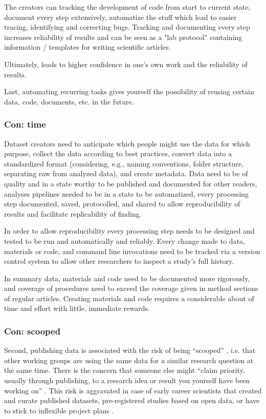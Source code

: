 %
The creators can tracking the development of code from start to current state,
document every step extensively, automatize the stuff which lead to easier
tracing, identifying and correcting bugs.
%
Tracking and documenting every step increases reliability of results and can be
seen as a "lab protocol" containing information / templates for writing
scientific articles.

%
Ultimately, leads to higher confidence in one's own work and the reliability of
results.

%
Last, automating recurring tasks gives yourself the possibility of reusing
certain data, code, documents, etc. in the future.



\subsubsection{Con: time}

%
Dataset creators need to anticipate which people might use the data for which
purpose, collect the data according to best practices, convert data into a
standardized format (considering, e.g., naming conventions, folder structure,
separating raw from analyzed data), and create metadata.
%
Data need to be of quality and in a state worthy to be published and documented
for other readers, analyses pipelines needed to be in a state to be automatized,
every processing step documented, saved, protocolled, and shared to allow
reproducibility of results and facilitate replicability of finding.

%
In order to allow reproducibility every processing step needs to be designed and
tested to be run and automatically and reliably.
%
Every change made to data, materials or code, and command line invocations need
to be tracked via a version control system \citep[e.g.,][]{halchenko2021datalad}
to allow other researchers to inspect a study's full history.

In summary data, materials and code need to be documented more rigorously, and
coverage of procedures need to exceed the coverage given in method sections of
regular articles.
%
Creating materials and code requires a considerable about of time and effort
with little, immediate rewards.



\subsubsection{Con: scooped}
%
Second, publishing data is associated with the risk of being ``scooped''
\citep[cf.][]{laine2017afraid}, i.e. that other working groups are using the
same data for a similar research question at the same time.
%
There is the concern that someone else might ``claim priority, usually through
publishing, to a research idea or result you yourself have been working on''
\citep{laine2017afraid}.
%
This risk is aggravated in case of early career scientists that created and
curate published datasets, pre-registered studies based on open data, or have to
stick to inflexible project plans \citep[cf.][]{toribio2021early}.



